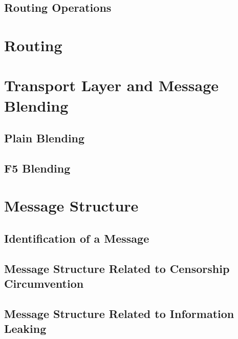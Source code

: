 \subsection{Routing Operations}
\section{Routing}



\section{Transport Layer and Message Blending}
\subsection{Plain Blending}
\subsection{F5 Blending}

\section{Message Structure}
\subsection{Identification of a Message}
\subsection{Message Structure Related to Censorship Circumvention}
\subsection{Message Structure Related to Information Leaking}

